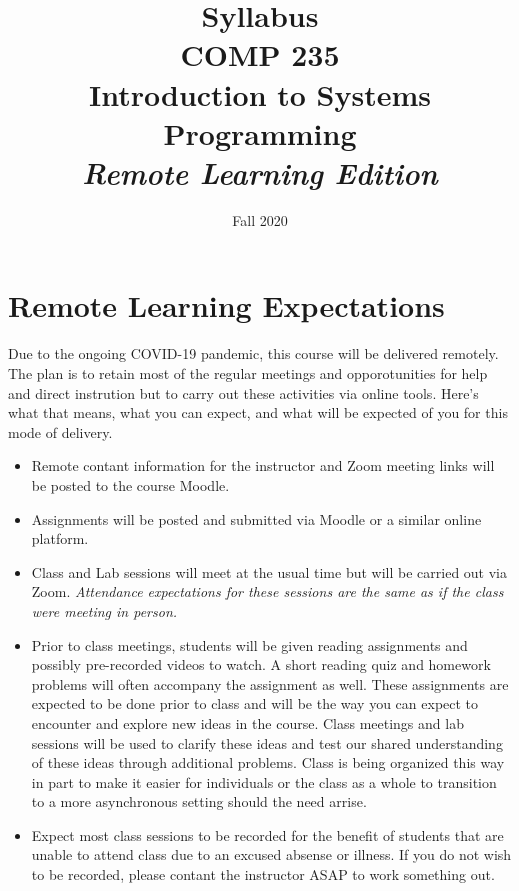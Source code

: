 \documentclass[10pt]{article}
\title{Syllabus \\ COMP 235 \\ Introduction to Systems Programming \\ \textit{Remote Learning Edition}}
\author{  }
\date{Fall 2020}
\begin{document}
\maketitle

\section{Remote Learning Expectations}

Due to the ongoing COVID-19 pandemic, this course will be delivered remotely. The plan
is to retain most of the regular meetings and opporotunities for help and direct instrution
but to carry out these activities via online tools. Here's what that means, what you can expect,
and what will be expected of you for this mode of delivery.

\begin{itemize}
  \item Remote contant information for the instructor and Zoom meeting links will be posted to the
  course Moodle.

  \item Assignments will be posted and submitted via Moodle or a similar online platform.

  \item Class and Lab sessions will meet at the usual time but will be carried out
  via Zoom. \textit{Attendance expectations for these sessions are the same as
  if the class were meeting in person.}

  \item Prior to class meetings, students will be given reading assignments and possibly
  pre-recorded videos to watch. A short reading quiz and homework problems will often
  accompany the assignment as well. These assignments are expected to be done prior to
  class and will be the way you can expect to encounter and explore new ideas in the course.
  Class meetings and lab sessions will be used to clarify these ideas and test our
  shared understanding of these ideas through additional problems. Class is being
  organized this way in part to make it easier for individuals or the class as a whole
  to transition to a more asynchronous setting should the need arrise.

  \item Expect most class sessions to be recorded for the benefit of students that
  are unable to attend class due to an excused absense or illness. If you do not wish
  to be recorded, please contant the instructor ASAP to work something out.


\end{itemize}
\end{document}
